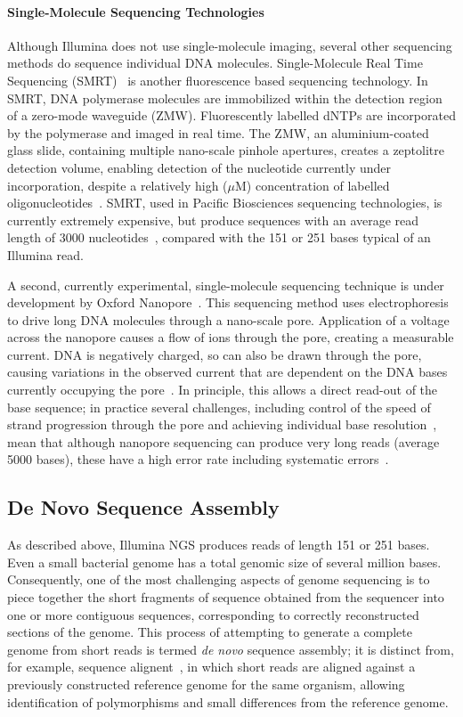 \paragraph{Single-Molecule Sequencing Technologies}
Although Illumina does not use single-molecule imaging, several other sequencing methods do sequence individual DNA molecules. Single-Molecule Real Time Sequencing (SMRT)~\cite{eid2008} is another fluorescence based sequencing technology. In SMRT, DNA polymerase molecules are immobilized within the detection region of a zero-mode waveguide (ZMW). Fluorescently labelled dNTPs are incorporated by the polymerase and imaged in real time. The ZMW, an aluminium-coated glass slide, containing multiple nano-scale pinhole apertures, creates a zeptolitre detection volume, enabling detection of the nucleotide currently under incorporation, despite a relatively high ($\mu$M) concentration of labelled oligonucleotides~\cite{Levene2003}. SMRT, used in Pacific Biosciences sequencing technologies, is currently extremely expensive, but produce sequences with an average read length of 3000 nucleotides~\cite{Roberts2013}, compared with the 151 or 251 bases typical of an Illumina read.

A second, currently experimental, single-molecule sequencing technique is under development by Oxford Nanopore~\cite{Bayley2014}. This sequencing method uses electrophoresis to drive long DNA molecules through a nano-scale pore. Application of a voltage across the nanopore causes a flow of ions through the pore, creating a measurable current. DNA is negatively charged, so can also be drawn through the pore, causing variations in the observed current that are dependent on the DNA bases currently occupying the pore~\cite{Branton2008}. In principle, this allows a direct read-out of the base sequence; in practice several challenges, including control of the speed of strand progression through the pore and achieving individual base resolution~\cite{Laszlo2014}, mean that although nanopore sequencing can produce very long reads (average 5000 bases), these have a high error rate including systematic errors~\cite{Mikheyev2014}.  

\subsection{De Novo Sequence Assembly}
As described above, Illumina NGS produces reads of length 151 or 251 bases. Even a small bacterial genome has a total genomic size of several million bases. Consequently, one of the most challenging aspects of genome sequencing is to piece together the short fragments of sequence obtained from the sequencer into one or more contiguous sequences, corresponding to correctly reconstructed sections of the genome. This process of attempting to generate a complete genome from short reads is termed \textit{de novo} sequence assembly; it is distinct from, for example, sequence alignent~\cite{Li2010}, in which short reads are aligned against a previously constructed reference genome for the same organism, allowing identification of polymorphisms and small differences from the reference genome. 

